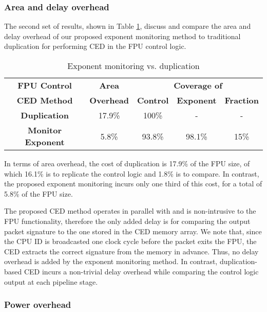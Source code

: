 \documentclass[12pt]{yalephd}
\begin{document}
\subsubsection{Area and delay overhead}\label{sC3sAreaDelayOverhead}

The second set of results, shown in Table \ref{sC3tAreaOverhead1}, discuss and compare the area and delay overhead of our proposed exponent monitoring method to traditional duplication for performing CED in the FPU control logic.

\begin{table}[!ht]
\caption{Exponent monitoring vs. duplication}\label{sC3tAreaOverhead1}
\tabcolsep 5pt
\begin{center}
\begin{tabular}{||c|c|c|c|c||}
\hline
\hline
{\bf FPU Control} & {\bf Area} & \multicolumn{3}{c||}{\bf Coverage of} \\
{\bf CED Method} & {\bf Overhead} & {\bf Control} & {\bf Exponent} & {\bf Fraction} \\
\hline
\hline
{\bf Duplication} & 17.9\% & 100\% & - & -\\
\hline
{\bf Monitor Exponent} & 5.8\% & 93.8\% & 98.1\% & 15\% \\
\hline
\hline
\end{tabular}
\end{center}
\end{table}

In terms of area overhead, the cost of duplication is 17.9\% of the FPU size, of which 16.1\% is to replicate the control logic and 1.8\% is to compare. In contrast, the proposed exponent monitoring incurs only one third of this cost, for a total of 5.8\% of the FPU size.

The proposed CED method operates in parallel with and is non-intrusive to the FPU functionality, therefore the only added delay is for comparing the output packet signature to the one stored in the CED memory array. We note that, since the CPU ID is broadcasted one clock cycle before the packet exits the FPU, the CED extracts the correct signature from the memory in advance. Thus, no delay overhead is added by the exponent monitoring method. In contrast, duplication-based CED incurs a non-trivial delay overhead while comparing the control logic output at each pipeline stage.


\subsubsection{Power overhead}\label{sC3sPowerOverhead}
\end{document}

